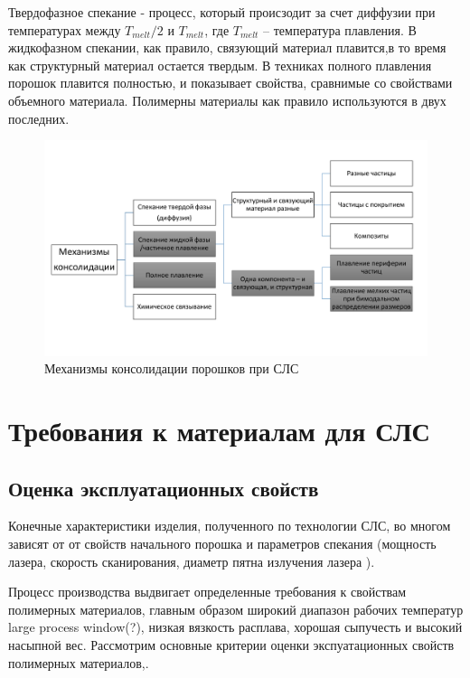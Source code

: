 Твердофазное спекание - процесс, который происзодит за счет диффузии при температурах между $T_{melt}/2$ и $T_{melt}$, где $T_{melt}$ -- температура плавления. В жидкофазном спекании, как правило, связующий материал  плавится,в то время как структурный материал остается твердым. В техниках полного плавления порошок плавится полностью, и показывает свойства, сравнимые со свойствами объемного материала. Полимерны материалы как правило используются в двух последних.



\begin{figure}[h]
    \centering
    \includegraphics[width = \linewidth]{fig/mecha.pdf}
    \caption{Механизмы консолидации порошков при СЛС}
    \label{fig:binding}
\end{figure}

\section{Требования к материалам для СЛС}

\subsection{Оценка эксплуатационных свойств}
Конечные характеристики изделия, полученного по технологии СЛС, во многом зависят от от свойств начального порошка  и параметров спекания (мощность лазера, скорость сканирования, диаметр пятна излучения лазера ).

Процесс производства выдвигает определенные требования к свойствам полимерных материалов, главным образом широкий диапазон рабочих температур large process window(?), низкая вязкость расплава, хорошая сыпучесть и высокий насыпной вес.
Рассмотрим основные критерии оценки экспуатационных свойств полимерных материалов,\cite{termopols}.



